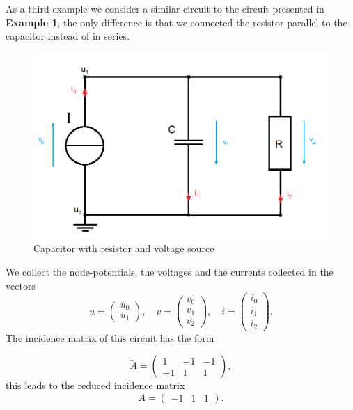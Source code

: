 \begin{example}
	\label{ex:Example 3 - incidence matrix }
	As a third example we consider a similar circuit to the circuit presented in \textbf{Example 1}, the only difference is that we connected the resistor parallel to the capacitor instead of in series.
	\begin{figure}[H]
		\label{circuit:Example 3}
		\centering
		\includegraphics[scale=0.5]{pictures/Example3.png}
		\caption{Capacitor with resistor and voltage source}
	\end{figure}
	
	We collect the node-potentials, the voltages and the currents collected in the vectors
	\begin{displaymath}
		u=
		\left(
		\begin{matrix}
			u_0 \\
			u_1 
		\end{matrix}
		\right),
		\quad
		v=
		\left(
		\begin{matrix}
			v_0 \\
			v_1 \\
			v_2 
		\end{matrix}
		\right),
		\quad
		i=
		\left(
		\begin{matrix}
			i_0 \\
			i_1 \\
			i_2 
		\end{matrix}
		\right).
	\end{displaymath}
	The incidence matrix of this circuit has the form
	
	\begin{displaymath}
		\tilde{A} = 
		\left(
		\begin{matrix}
			1 & -1 & -1 \\
			-1 & 1 & 1 
		\end{matrix}
		\right),
	\end{displaymath}
	this leads to the reduced incidence matrix
	\begin{displaymath}
		A = 
		\left(
		\begin{matrix}
			-1 & 1 & 1
		\end{matrix}
		\right).
	\end{displaymath}
\end{example}


